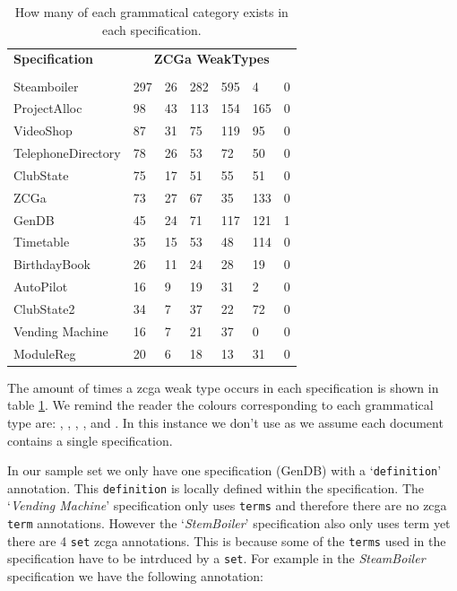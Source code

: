 \begin{table}[H]
\centering
\begin{tabular}{|l |l | l |l | l| l | l |}
\hline
\textbf{Specification} & \multicolumn{6}{c|}{\textbf{ZCGa WeakTypes}}\\
\cline{2-7}
 & \cgatext{} & \declaration{} & \expression{} & \term{} & \set{} & {} \\
\hline
Steamboiler & 297 & 26 & 282 & 595 & 4 & 0 \\
ProjectAlloc & 98 & 43 & 113 & 154 & 165 & 0\\
VideoShop  & 87 & 31 & 75 & 119 & 95 & 0 \\
TelephoneDirectory & 78 & 26 & 53 & 72 & 50 & 0 \\
ClubState & 75 & 17 & 51 & 55 & 51 & 0 \\
ZCGa & 73 & 27 & 67 & 35 & 133 & 0 \\
GenDB & 45 & 24 & 71 & 117 & 121 & 1 \\
Timetable & 35 & 15 & 53 & 48 & 114 & 0 \\
BirthdayBook & 26 & 11 & 24 & 28 & 19 & 0 \\
AutoPilot & 16 & 9 & 19 & 31 & 2 & 0\\
ClubState2 & 34 & 7 & 37 & 22 & 72 & 0 \\
Vending Machine & 16 & 7 & 21 & 37 & 0 & 0 \\
ModuleReg & 20 & 6 & 18 & 13 & 31 & 0 \\
\hline
\end{tabular}
\caption{How many of each grammatical category exists in each specification. \label{tab:specgram}}
\end{table}

The amount of times a \gls{zcga} weak type occurs in each specification is shown in table \ref{tab:specgram}. We remind the reader the colours corresponding to each grammatical type are: , , , ,  and . In this instance we don't use  as we assume each document contains a single specification.

In our sample set we only have one specification (GenDB) with a `\texttt{definition}' annotation. This \texttt{definition} is locally defined within the specification. The `\emph{Vending Machine}' specification only uses \texttt{terms} and therefore there are no \gls{zcga} \texttt{term} annotations. However the `\emph{StemBoiler}' specification also only uses term yet there are 4 \texttt{set} \gls{zcga} annotations. This is because some of the \texttt{terms} used in the specification have to be intrduced by a \texttt{set}. For example in the \emph{SteamBoiler} specification we have the following annotation:

